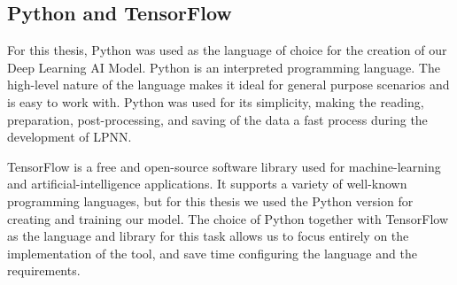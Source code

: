 \subsection{Python and TensorFlow}
For this thesis, Python was used as the language of choice for the creation of our Deep Learning AI Model. Python is an interpreted programming language. The high-level nature of the language makes it ideal for general purpose scenarios and is easy to work with. Python was used for its simplicity, making the reading, preparation, post-processing, and saving of the data a fast process during the development of LPNN.\newline

TensorFlow is a free and open-source software library used for machine-learning and artificial-intelligence applications. It supports a variety of well-known programming languages, but for this thesis we used the Python version for creating and training our model. The choice of Python together with TensorFlow as the language and library for this task allows us to focus entirely on the implementation of the tool, and save time configuring the language and the requirements.
